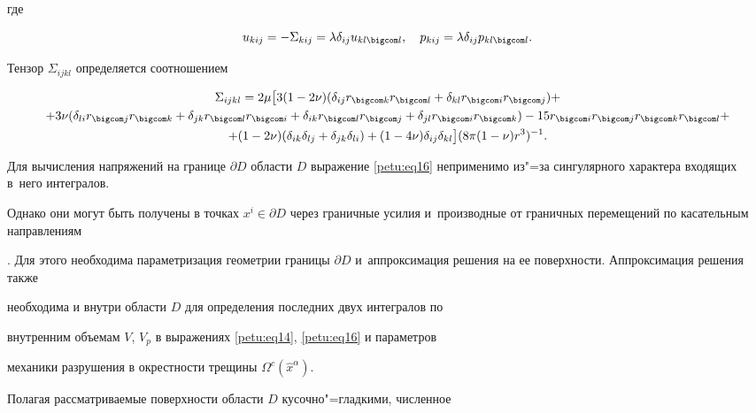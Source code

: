 где 

$$

u_{kij} =-\Sigma _{kij} =\lambda \delta _{ij} u_{kl \bigcom l},\quad 

p_{kij} =\lambda \delta_{ij} p_{kl \bigcom l}.$$ 

Тензор $\Sigma _{ijkl}$ определяется соотношением

\begin{multline*}

\Sigma _{ijkl} =2\mu \bigl[

3(1-2\nu )(\delta _{ij} r_{ \bigcom k} r_{ \bigcom l} +\delta

_{kl} r_{ \bigcom i} r_{ \bigcom j} )+\\

+3\nu (\delta _{li} r_{ \bigcom j} r_{ \bigcom k} +\delta _{jk} r_{ \bigcom l}

r_{ \bigcom i} +\delta _{ik} r_{ \bigcom l} r_{ \bigcom j} +\delta _{jl} r_{ \bigcom i} r_{ \bigcom k})

-15r_{ \bigcom i} r_{ \bigcom j} r_{ \bigcom k} r_{ \bigcom l} +

\\ +(1-2\nu )(\delta _{ik} \delta _{lj} +\delta _{jk} \delta _{li} )

+(1-4\nu )\delta

_{ij} \delta _{kl} \bigr](8\pi (1-\nu )r^3)^{-1}.

\end{multline*}

Для вычисления напряжений на границе $\partial D$ области $D$ выражение \eqref{petu:eq16} неприменимо из"=за сингулярного характера входящих в~него интегралов.

Однако они могут быть получены в точках $x^i\in \partial D$ через граничные усилия и~производные от граничных перемещений по касательным направлениям

\cite{petu:bib14}. Для этого необходима параметризация геометрии границы $\partial D$ и~аппроксимация решения на ее поверхности. Аппроксимация решения также

необходима и внутри области $D$ для определения последних двух интегралов по

внутренним объемам $V$, $V_p$ в выражениях \eqref{petu:eq14}, \eqref{petu:eq16} и параметров

механики разрушения в окрестности трещины $\Omega^c \left({\hat {x}}^\alpha \right)$.



Полагая рассматриваемые поверхности области $D$ кусочно"=гладкими, численное

